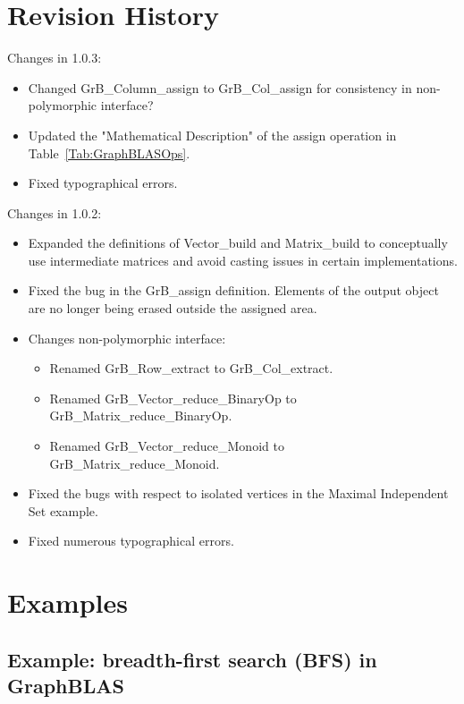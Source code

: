 \chapter{Revision History}
Changes in 1.0.3:
\begin{itemize}
\item Changed {\sf GrB\_Column\_assign} to {\sf GrB\_Col\_assign} for consistency in non-polymorphic interface?
\item Updated the "Mathematical Description" of the assign operation in Table~\ref{Tab:GraphBLASOps}.
\item Fixed typographical errors.
\end{itemize}  

Changes in 1.0.2:
\begin{itemize}
\item Expanded the definitions of {\sf Vector\_build} and {\sf Matrix\_build} to conceptually use intermediate matrices and avoid casting issues in certain implementations.
\item Fixed the bug in the {\sf GrB\_assign} definition. Elements of the output object are no longer being erased outside the assigned area.
\item Changes non-polymorphic interface:
    \begin{itemize}
    \item Renamed {\sf GrB\_Row\_extract} to {\sf GrB\_Col\_extract}.
    \item Renamed {\sf GrB\_Vector\_reduce\_BinaryOp} to {\sf GrB\_Matrix\_reduce\_BinaryOp}.
    \item Renamed {\sf GrB\_Vector\_reduce\_Monoid} to {\sf GrB\_Matrix\_reduce\_Monoid}.
    \end{itemize}
\item Fixed the bugs with respect to isolated vertices in the Maximal Independent Set example.
\item Fixed numerous typographical errors.
\end{itemize}  

\chapter{Examples}
\label{Chp:Examples}

\pagebreak
\nolinenumbers
\section{Example: breadth-first search (BFS) in GraphBLAS}
{\scriptsize

}

